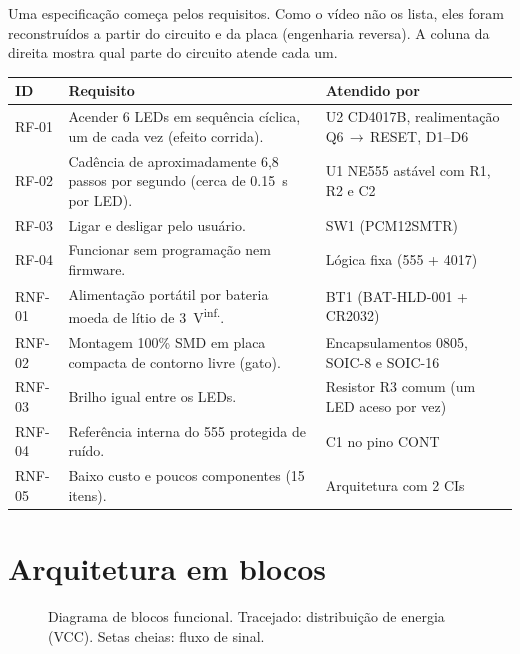 \documentclass[11pt,a4paper]{article}
\newcommand{\inferido}{\textsuperscript{\textcolor{douradoEsc}{\sffamily inf.}}}
\begin{document}
Uma especificação começa pelos requisitos. Como o vídeo não os lista, eles foram
reconstruídos a partir do circuito e da placa (engenharia reversa). A coluna da direita
mostra qual parte do circuito atende cada um.

\begin{center}
\small
\begin{tabularx}{\linewidth}{@{}l Y L{4.3cm}@{}}
\toprule
\textbf{ID} & \textbf{Requisito} & \textbf{Atendido por} \\
\midrule
RF-01 & Acender 6 LEDs em sequência cíclica, um de cada vez (efeito corrida). & U2 CD4017B, realimentação Q6\,$\to$\,RESET, D1–D6 \\
RF-02 & Cadência de aproximadamente 6,8 passos por segundo (cerca de \SI{0,15}{\second} por LED). & U1 NE555 astável com R1, R2 e C2 \\
RF-03 & Ligar e desligar pelo usuário. & SW1 (PCM12SMTR) \\
RF-04 & Funcionar sem programação nem firmware. & Lógica fixa (555 + 4017) \\
RNF-01 & Alimentação portátil por bateria moeda de lítio de \SI{3}{\volt}\inferido. & BT1 (BAT-HLD-001 + CR2032) \\
RNF-02 & Montagem 100\% SMD em placa compacta de contorno livre (gato). & Encapsulamentos 0805, SOIC-8 e SOIC-16 \\
RNF-03 & Brilho igual entre os LEDs. & Resistor R3 comum (um LED aceso por vez) \\
RNF-04 & Referência interna do 555 protegida de ruído. & C1 no pino CONT \\
RNF-05 & Baixo custo e poucos componentes (15 itens). & Arquitetura com 2 CIs \\
\bottomrule
\end{tabularx}
\end{center}

\section{Arquitetura em blocos}

\begin{figure}[H]
\centering
\diagramaBlocos
\caption{Diagrama de blocos funcional. Tracejado: distribuição de energia (VCC).
Setas cheias: fluxo de sinal.}
\label{fig:blocos}
\end{figure}
\end{document}
